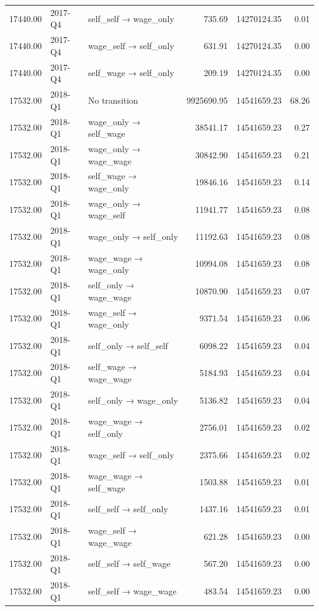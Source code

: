 \begin{table}[ht]
{\begin{tabular}{rllrrr}
  17440.00 & 2017-Q4 & self\_self → wage\_only & 735.69 & 14270124.35 & 0.01 \\ 
  17440.00 & 2017-Q4 & wage\_self → self\_only & 631.91 & 14270124.35 & 0.00 \\ 
  17440.00 & 2017-Q4 & self\_wage → self\_only & 209.19 & 14270124.35 & 0.00 \\ 
  17532.00 & 2018-Q1 & No transition & 9925690.95 & 14541659.23 & 68.26 \\ 
  17532.00 & 2018-Q1 & wage\_only → self\_wage & 38541.17 & 14541659.23 & 0.27 \\ 
  17532.00 & 2018-Q1 & wage\_only → wage\_wage & 30842.90 & 14541659.23 & 0.21 \\ 
  17532.00 & 2018-Q1 & self\_wage → wage\_only & 19846.16 & 14541659.23 & 0.14 \\ 
  17532.00 & 2018-Q1 & wage\_only → wage\_self & 11941.77 & 14541659.23 & 0.08 \\ 
  17532.00 & 2018-Q1 & wage\_only → self\_only & 11192.63 & 14541659.23 & 0.08 \\ 
  17532.00 & 2018-Q1 & wage\_wage → wage\_only & 10994.08 & 14541659.23 & 0.08 \\ 
  17532.00 & 2018-Q1 & self\_only → wage\_wage & 10870.90 & 14541659.23 & 0.07 \\ 
  17532.00 & 2018-Q1 & wage\_self → wage\_only & 9371.54 & 14541659.23 & 0.06 \\ 
  17532.00 & 2018-Q1 & self\_only → self\_self & 6098.22 & 14541659.23 & 0.04 \\ 
  17532.00 & 2018-Q1 & self\_wage → wage\_wage & 5184.93 & 14541659.23 & 0.04 \\ 
  17532.00 & 2018-Q1 & self\_only → wage\_only & 5136.82 & 14541659.23 & 0.04 \\ 
  17532.00 & 2018-Q1 & wage\_wage → self\_only & 2756.01 & 14541659.23 & 0.02 \\ 
  17532.00 & 2018-Q1 & wage\_self → self\_only & 2375.66 & 14541659.23 & 0.02 \\ 
  17532.00 & 2018-Q1 & wage\_wage → self\_wage & 1503.88 & 14541659.23 & 0.01 \\ 
  17532.00 & 2018-Q1 & self\_self → self\_only & 1437.16 & 14541659.23 & 0.01 \\ 
  17532.00 & 2018-Q1 & wage\_self → wage\_wage & 621.28 & 14541659.23 & 0.00 \\ 
  17532.00 & 2018-Q1 & self\_self → self\_wage & 567.20 & 14541659.23 & 0.00 \\ 
  17532.00 & 2018-Q1 & self\_self → wage\_wage & 483.54 & 14541659.23 & 0.00 \\ 

\end{tabular}}
\end{table}
